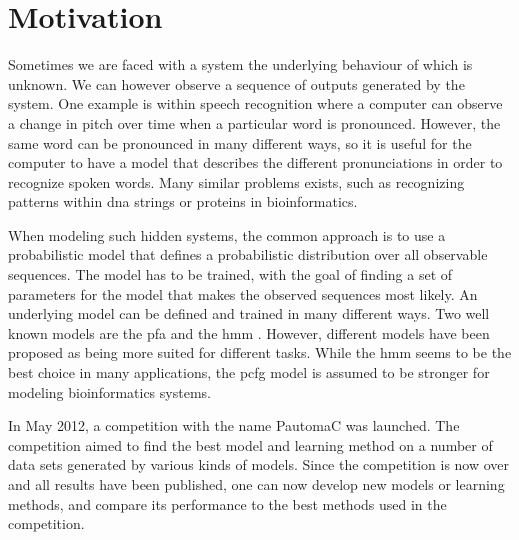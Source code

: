 \section{Motivation}
Sometimes we are faced with a system the underlying behaviour of which is unknown. We can however observe a sequence of outputs generated by the system. One example is within speech recognition \cite{Rabiner89hmm} where a computer can observe a change in pitch over time when a particular word is pronounced. However, the same word can be pronounced in many different ways, so it is useful for the computer to have a model that describes the different pronunciations in order to recognize spoken words. Many similar problems exists, such as recognizing patterns within \gls{dna} strings or proteins in bioinformatics\cite{Sakakibara2005}.

When modeling such hidden systems, the common approach is to use a probabilistic model that defines a probabilistic distribution over all observable sequences. The model has to be trained, with the goal of finding a set of parameters for the model that makes the observed sequences most likely. An underlying model can be defined and trained in many different ways. Two well known models are the \gls{pfa} \cite{pazintroduction} and the \gls{hmm} \cite{Rabiner89hmm}. However, different models have been proposed as being more suited for different tasks. While the \gls{hmm} seems to be the best choice in many applications, the \gls{pcfg} model is assumed to be stronger for modeling bioinformatics systems\cite{Sakakibara2005}.

In May 2012, a competition with the name PautomaC was launched. The competition aimed to find the best model and learning method on a number of data sets generated by various kinds of models. Since the competition is now over and all results have been published, one can now develop new models or learning methods, and compare its performance to the best methods used in the competition.